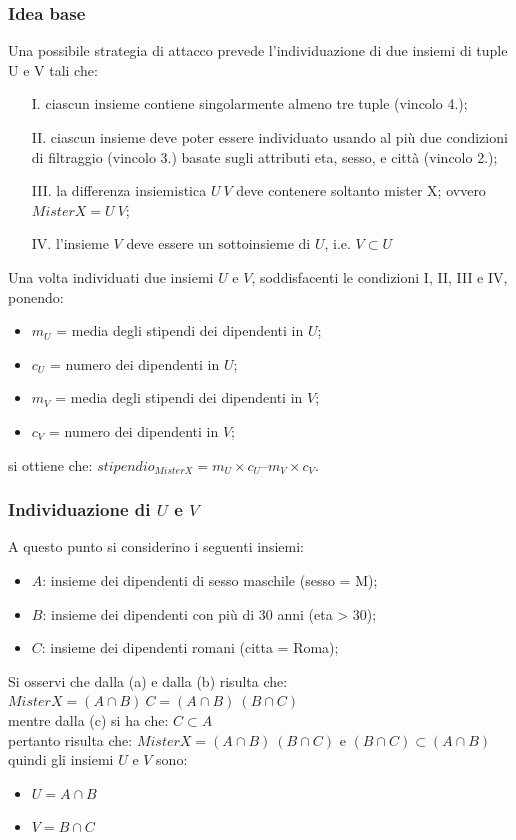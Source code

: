 \subsubsection{Idea base}
Una possibile strategia di attacco prevede l'individuazione di due insiemi di tuple U e V tali che:
\begin{enumerate}
\item [I.] ciascun insieme contiene singolarmente almeno tre tuple (vincolo 4.);
\item [II.] ciascun insieme deve poter essere individuato usando al più due condizioni di filtraggio (vincolo 3.) basate sugli attributi eta, sesso, e città (vincolo 2.);
\item [III.] la differenza insiemistica $U \ V$ deve contenere soltanto mister X; ovvero ${Mister X} = U \ V$;
\item [IV.] l'insieme $V$ deve essere un sottoinsieme di $U$, i.e. $V \subset U$
\end{enumerate}
Una volta individuati due insiemi $U$ e $V$, soddisfacenti le condizioni I, II, III e IV, ponendo:
\begin{itemize}
\item $m_{U}$ = media degli stipendi dei dipendenti in $U$;
\item $c_{U}$ = numero dei dipendenti in $U$;
\item $m_{V}$ = media degli stipendi dei dipendenti in $V$;
\item $c_{V}$ = numero dei dipendenti in $V$;
\end{itemize}
si ottiene che: $stipendio_{Mister X} = m_{U} \times c_{U} – m_{V} \times c_{V}$.\\
\subsubsection{Individuazione di $U$ e $V$}
A questo punto si considerino i seguenti insiemi:
\begin{itemize}
\item $A$: insieme dei dipendenti di sesso maschile (sesso = M);
\item $B$: insieme dei dipendenti con più di 30 anni (eta > 30);
\item $C$: insieme dei dipendenti romani (citta = Roma);
\end{itemize}
Si osservi che dalla (a) e dalla (b) risulta che: ${Mister X} = (A \cap B) \ C = (A \cap B) \ (B \cap C)$\\
mentre dalla (c) si ha che: $C \subset A$\\
pertanto risulta che: ${Mister X} = (A \cap B) \ (B \cap C)$ e $(B \cap C) \subset (A \cap B)$\\
quindi gli insiemi $U$ e $V$ sono:
\begin{itemize}
\item $U = A \cap B$
\item $V = B \cap C$
\end{itemize}
